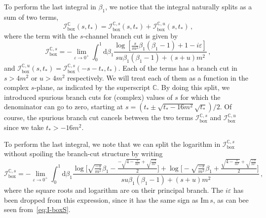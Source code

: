 \documentclass[12pt]{article}
\numberwithin{figure}{section}
\def \be {\begin{equation}}
\def \ee {\end{equation}}
\def \C {\mathbb{C}}
\def \d {\mathrm{d}}
\def \eps {\varepsilon}
\def \I {\mathcal{I}}
\def \Im {\mathrm{Im}}
\def \boxx {\mathrm{box}}
\begin{document}
    To perform the last integral in $\beta_1$, we notice that the integral naturally splits as a sum of two terms,
    \be 
	    \I_\boxx^\C (s,t_\ast) = \I_\boxx^{\C,s} (s,t_\ast) + \I_\boxx^{\C,u} (s,t_\ast) \,,
	    \label{eq:box_su}
	\ee 
	where the term with the $s$-channel branch cut is given by
    \be 
    \I_\boxx^{\C,s} = - \lim_{\eps \to 0^+} \int_0^1 \d \beta_1
        \frac{\log\left[\frac{s}{m^2} \beta_1 \left(\beta_1-1\right)+ 1 - i \eps \right]}{s u \beta_1 \left( \beta_1 - 1 \right) + (s+u) m^2} \,,
        \label{eq:I-boxS}
    \ee 
    and $\I_\boxx^{\C,u}(s,t_\ast) = \I_\boxx^{\C,s}(-s{-}t_\ast,t_\ast)$. Each of the terms has a branch cut in $s>4m^2$ or $u>4m^2$ respectively.
    We will treat each of them as a function in the complex $s$-plane, as indicated by the superscript $\C$. 
    By doing this split, we introduced spurious branch cuts for (complex) values of $s$ for which the denominator can go to zero, starting at $s= (t_\ast \pm \sqrt{t_\ast-16m^2} \sqrt{t_\ast})/2$. Of course, the spurious branch cut cancels between the two terms $\I_\boxx^{\C,s}$ and $\I_\boxx^{\C,u}$ since we take $t_\ast>-16 m^2$.

    To perform the last integral, we note that we can split the logarithm in $\I_\boxx^{\C,s}$ without spoiling
    the branch-cut structure by writing
    \be 
        \I_\boxx^{\C,s} = - \lim_{\eps \to 0^+} \int_0^1 \d \beta_1
        \frac{\log\Big[\sqrt{\tfrac{-s}{m^2}} \beta_1 - \frac{-\sqrt{4-\tfrac{s}{m^2}}+\sqrt{\tfrac{-s}{m^2}}}{2} \Big]+\log\Big[-\sqrt{\tfrac{-s}{m^2}} \beta_1 + \frac{\sqrt{4-\tfrac{s}{m^2}}+\sqrt{\tfrac{-s}{m^2}}}{2} \Big]}{s u \beta_1\left( \beta_1 - 1 \right) + (s+u) m^2} \,,
    \ee 
    where the square roots and logarithm are on their principal branch. The $i\varepsilon$ has been dropped from this expression, since it has the same sign as $\Im\, s$, as can bee seen from~\eqref{eq:I-boxS}.
    
\end{document}
